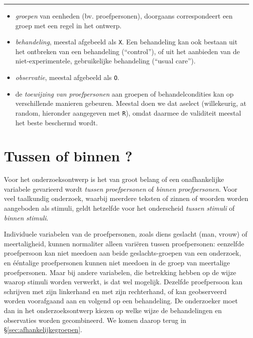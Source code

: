 \documentclass[
]{book}
\begin{document}
\begin{center}\rule{0.5\linewidth}{0.5pt}\end{center}

\begin{itemize}
\item
  \emph{groepen} van eenheden (bv. proefpersonen), doorgaans correspondeert
  een groep met een regel in het ontwerp.
\item
  \emph{behandeling}, meestal afgebeeld als \texttt{X}. Een behandeling kan ook
  bestaan uit het ontbreken van een behandeling (``control''), of uit
  het aanbieden van de niet-experimentele, gebruikelijke behandeling
  (``usual care'').
\item
  \emph{observatie}, meestal afgebeeld als \texttt{O}.
\item
  de \emph{toewijzing van proefpersonen} aan groepen of behandelcondities
  kan op verschillende manieren gebeuren. Meestal doen we dat aselect
  (willekeurig, at random, hieronder aangegeven met \texttt{R}), omdat
  daarmee de validiteit meestal het beste beschermd wordt.
\end{itemize}

\section{Tussen of binnen ?}\label{sec:tussenbinnenproefpersonen}

Voor het onderzoeksontwerp is het van groot belang of een onafhankelijke variabele
gevarieerd wordt \emph{tussen proefpersonen} of \emph{binnen proefpersonen}. Voor
veel taalkundig onderzoek, waarbij meerdere teksten of zinnen of woorden
worden aangeboden als stimuli, geldt hetzelfde voor het onderscheid
\emph{tussen stimuli} of \emph{binnen stimuli}.

Individuele variabelen van de proefpersonen, zoals diens geslacht
(man, vrouw) of meertaligheid, kunnen normaliter alleen variëren
tussen proefpersonen: eenzelfde proefpersoon kan niet meedoen aan beide
geslachts-groepen van een onderzoek, en ééntalige proefpersonen kunnen
niet meedoen in de groep van meertalige proefpersonen. Maar bij andere
variabelen, die betrekking hebben op de wijze waarop stimuli worden
verwerkt, is dat wel mogelijk. Dezelfde proefpersoon kan schrijven met
zijn linkerhand en met zijn rechterhand, of kan geobserveerd worden
voorafgaand aan en volgend op een behandeling. De onderzoeker moet dan
in het onderzoeksontwerp kiezen op welke wijze de behandelingen en
observaties worden gecombineerd. We komen daarop terug in
§\ref{sec:afhankelijkegroepen}.
\end{document}
